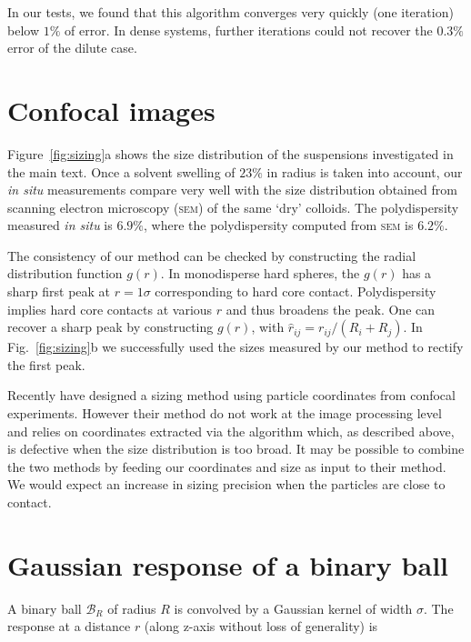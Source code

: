 In our tests, we found that this algorithm converges very quickly (one iteration) below $1\%$ of error. In dense systems, further iterations could not recover the $0.3\%$ error of the dilute case.

\section*{Confocal images}



Figure~\ref{fig:sizing}a shows the size distribution of the suspensions investigated in the main text. Once a solvent swelling of $23\%$ in radius is taken into account, our \emph{in situ} measurements compare very well with the size distribution obtained from scanning electron microscopy (\textsc{sem}) of the same `dry' colloids. The polydispersity measured \emph{in situ} is $6.9\%$, where the polydispersity computed from \textsc{sem} is $6.2\%$.

The consistency of our method can be checked by constructing the radial distribution function $g(r)$. In monodisperse hard spheres, the $g(r)$ has a sharp first peak at $r=1\sigma$ corresponding to hard core contact. Polydispersity implies hard core contacts at various $r$ and thus broadens the peak. One can recover a sharp peak by constructing $g(\hat{r})$, with $\hat{r}_{ij} = r_{ij}/(R_i+R_j)$. In Fig.~\ref{fig:sizing}b we successfully used the sizes measured by our method to rectify the first peak.

Recently \citet{Kurita2011,Kurita2011b} have designed a sizing method using particle coordinates from confocal experiments. However their method do not work at the image processing level and relies on coordinates extracted via the \citet{Crocker1996} algorithm which, as described above, is defective when the size distribution is too broad. It may be possible to combine the two methods by feeding our coordinates and size as input to their method. We would expect an increase in sizing precision when the particles are close to contact.

\appendix

\section{Gaussian response of a binary ball}
\label{sec:gaussian_vs_ball}

A binary ball $\mathcal{B}_R$ of radius $R$ is convolved by a Gaussian kernel of width $\sigma$. The response at a distance $r$ (along z-axis without loss of generality) is

